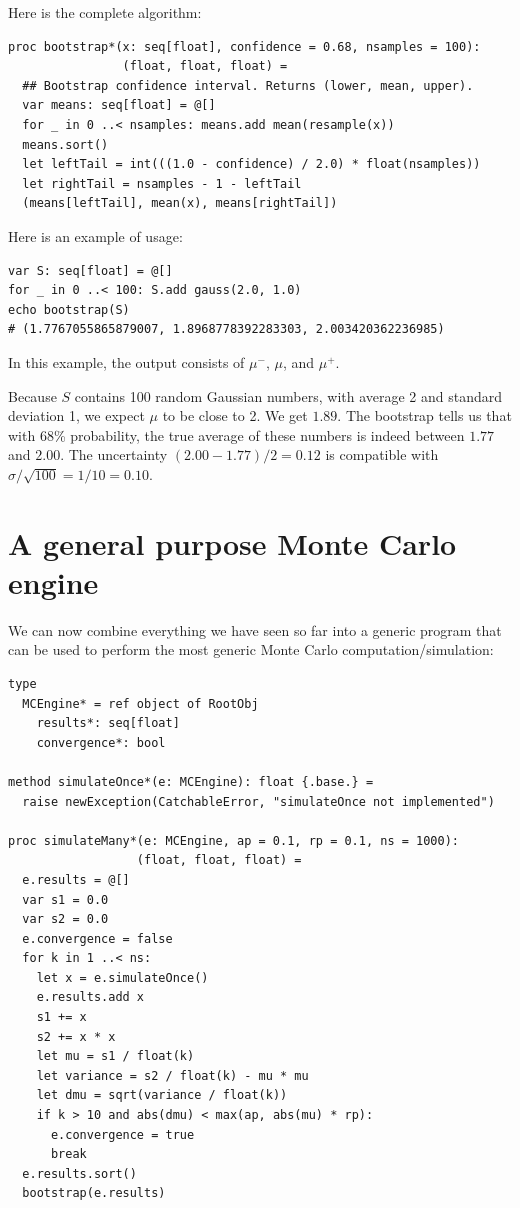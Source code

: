 \documentclass[justified, sixbynine]{tufte-book}
\def\ft{\small\tt}
\theoremstyle{plain}%
\newtheorem * {corollary}{Corollary}
\theoremstyle{definition}
\theoremstyle{remark}
\newtheorem * {remark}{Remark}
\newtheorem * {note}{Note}
\begin{document}
\begin{fullwidth}
Here is the complete algorithm:

\begin{lstlisting}[caption={in file: {\ft nlib/montecarlo.nim}}]
proc bootstrap*(x: seq[float], confidence = 0.68, nsamples = 100):
                (float, float, float) =
  ## Bootstrap confidence interval. Returns (lower, mean, upper).
  var means: seq[float] = @[]
  for _ in 0 ..< nsamples: means.add mean(resample(x))
  means.sort()
  let leftTail = int(((1.0 - confidence) / 2.0) * float(nsamples))
  let rightTail = nsamples - 1 - leftTail
  (means[leftTail], mean(x), means[rightTail])
\end{lstlisting}

Here is an example of usage:

\begin{lstlisting}
var S: seq[float] = @[]
for _ in 0 ..< 100: S.add gauss(2.0, 1.0)
echo bootstrap(S)
# (1.7767055865879007, 1.8968778392283303, 2.003420362236985)
\end{lstlisting}

In this example, the output consists of $\mu^-$, $\mu$, and $\mu^+$.

Because $S$ contains 100 random Gaussian numbers, with average 2 and standard deviation 1, we expect $\mu$ to be close to 2. We get $1.89$. The bootstrap tells us that with 68\% probability, the true average of these numbers is indeed between $1.77$ and $2.00$. The uncertainty $(2.00-1.77)/2 = 0.12$ is compatible with $\sigma/\sqrt{100} = 1/10 = 0.10$.

\goodbreak\section{A general purpose Monte Carlo engine}

We can now combine everything we have seen so far into a generic program that can be used to perform the most generic Monte Carlo computation/simulation:


\begin{lstlisting}[caption={in file: {\ft nlib/montecarlo.nim}}]
type
  MCEngine* = ref object of RootObj
    results*: seq[float]
    convergence*: bool

method simulateOnce*(e: MCEngine): float {.base.} =
  raise newException(CatchableError, "simulateOnce not implemented")

proc simulateMany*(e: MCEngine, ap = 0.1, rp = 0.1, ns = 1000):
                  (float, float, float) =
  e.results = @[]
  var s1 = 0.0
  var s2 = 0.0
  e.convergence = false
  for k in 1 ..< ns:
    let x = e.simulateOnce()
    e.results.add x
    s1 += x
    s2 += x * x
    let mu = s1 / float(k)
    let variance = s2 / float(k) - mu * mu
    let dmu = sqrt(variance / float(k))
    if k > 10 and abs(dmu) < max(ap, abs(mu) * rp):
      e.convergence = true
      break
  e.results.sort()
  bootstrap(e.results)
\end{lstlisting}


\end{fullwidth}
\end{document}
